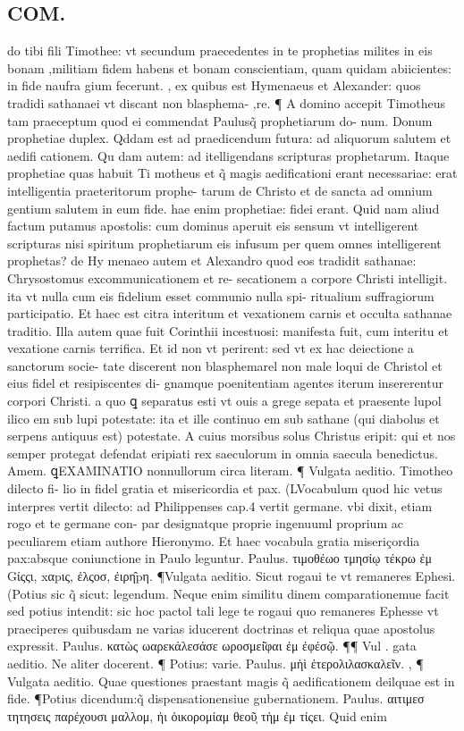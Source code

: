 \documentclass{article}
\begin{document}
\begin{pages}
\section*{COM. }
\marginpar{[ p.1 ]}\pstart do tibi fili Timothee: vt secundum praecedentes in te prophetias milites in eis bonam ,militiam fidem habens et bonam conscientiam, quam quidam abiicientes: in fide naufra gium fecerunt. , ex quibus est Hymenaeus et Alexander: quos tradidi sathanaei vt discant non blasphema- ,re. ¶ A domino accepit Timotheus tam praeceptum quod ei commendat Paulusq̃ prophetiarum do- num. Donum prophetiae duplex. Qddam est ad praedicendum futura: ad aliquorum salutem et aedifi cationem. Qu dam autem: ad itelligendans scripturas prophetarum. Itaque prophetiae quas habuit Ti motheus et q̃ magis aedificationi erant necessariae: erat intelligentia praeteritorum prophe- tarum de Christo et de sancta ad omnium gentium salutem in eum fide. hae enim prophetiae: fidei erant. Quid nam aliud factum putamus apostolis: cum dominus aperuit eis sensum vt intelligerent scripturas nisi spiritum prophetiarum eis infusum per quem omnes intelligerent prophetas? de Hy menaeo autem et Alexandro quod eos tradidit sathanae: Chrysostomus excommunicationem et re- secationem a corpore Christi intelligit. ita vt nulla cum eis fidelium esset communio nulla spi- ritualium suffragiorum participatio. Et haec est citra interitum et vexationem carnis et occulta sathanae traditio. Illa autem quae fuit Corinthii incestuosi: manifesta fuit, cum interitu et vexatione carnis terrifica. Et id non vt perirent: sed vt ex hac deiectione a sanctorum socie- tate discerent non blasphemarel non male loqui de Christol et eius fidel et resipiscentes di- gnamque poenitentiam agentes iterum insererentur corpori Christi. a quo ꝗ separatus esti vt ouis a grege sepata et praesente lupol ilico em sub lupi potestate: ita et ille continuo em sub sathane (qui diabolus et serpens antiquus est) potestate. A cuius morsibus solus Christus eripit: qui et nos semper protegat defendat eripiati rex saeculorum in omnia saecula benedictus. Amem.  \pend\pstart  ꝗEXAMINATIO nonnullorum circa literam. ¶ Vulgata aeditio. Timotheo dilecto fi- lio in fidel gratia et misericordia et pax. (LVocabulum quod hic vetus interpres vertit dilecto: ad Philippenses cap.4 vertit germane. vbi dixit, etiam rogo et te germane con- par designatque proprie ingenuuml proprium ac peculiarem etiam authore Hieronymo. Et haec vocabula gratia miseriçordia pax:absque coniunctione in Paulo leguntur. Paulus. τιμοθέωο τμησίῳ τέκρω ἐμ Gίςςι, xαpις, ἐλςοσ, ἐιρη̂pη. ¶Vulgata aeditio.  Sicut rogaui te vt remaneres Ephesi. (Potius sic q̃ sicut: legendum. Neque enim similitu dinem comparationemue facit sed potius intendit: sic hoc pactol tali lege te rogaui quo remaneres Ephesse vt praeciperes quibusdam ne varias iducerent doctrinas et reliqua quae apostolus expressit. Paulus. κατὼς ωαρεκάλεσάσε ωροσμεί͂φαι ἐμ ἐφέσῷ. ¶¶ Vul . gata aeditio. Ne aliter docerent. ¶ Potius: varie. Paulus. μὴὶ ἐτερολιλασκαλεῖν. , ¶ Vulgata aeditio. Quae questiones praestant magis q̃ aedificationem deilquae est in fide. ¶Potius dicendum:q̃ dispensationensiue gubernationem. Paulus. αιτιμεσ τητησεις παρέχουσι μαλλομ, ἠι ὀικορομίαμ θεοῦͅ τὴμ ἐμ τίςει. Quid enim 
\end{pages}
\end{document}

